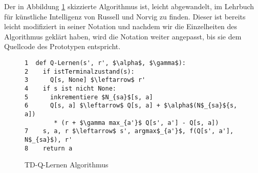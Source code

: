 Der in Abbildung \ref{fig:TD-Q-Lernen Algorithmus} skizzierte Algorithmus ist, leicht abgewandelt, im Lehrbuch für künstliche Intelligenz von Russell und Norvig \cite[974]{Russell} zu finden. Dieser ist bereits leicht modifiziert in seiner Notation und nachdem wir die Einzelheiten des Algorithmus geklärt haben, wird die Notation weiter angepasst, bis sie dem Quellcode des Prototypen entspricht. \\

\begin{figure}[!htbp]
\centering
\begin{lstlisting}[frame=single, mathescape=true]
1  def Q-Lernen(s', r', $\alpha$, $\gamma$):
2    if istTerminalzustand(s):
3      Q[s, None] $\leftarrow$ r'
4    if s ist nicht None:
5      inkrementiere $N_{sa}$[s, a]
6      Q[s, a] $\leftarrow$ Q[s, a] + $\alpha$(N$_{sa}${s, a])
  		* (r + $\gamma max_{a'}$ Q[s', a'] - Q[s, a])
7    s, a, r $\leftarrow$ s', argmax$_{a'}$, f(Q[s', a'], N$_{sa}$), r'
8    return a
\end{lstlisting}
\caption{TD-Q-Lernen Algorithmus}
\label{fig:TD-Q-Lernen Algorithmus}
\end{figure} 

